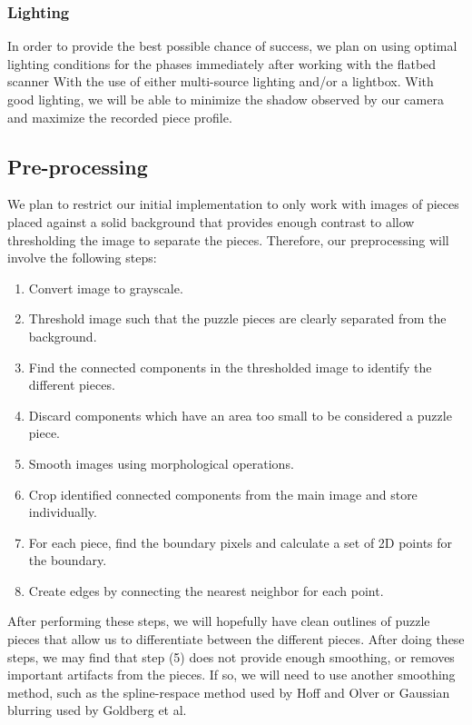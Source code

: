 \documentclass[12pt]{report}
\begin{document}
\subsubsection*{Lighting}
In order to provide the best possible chance of success, we plan on using optimal lighting conditions for the phases immediately after working with the flatbed scanner With the use of either multi-source lighting and/or a lightbox. With good lighting, we will be able to minimize the shadow observed by our camera and maximize the recorded piece profile.


\subsection*{Pre-processing}
We plan to restrict our initial implementation to only work with images of pieces placed against a solid background that provides enough contrast to allow thresholding the image to separate the pieces. Therefore, our preprocessing will involve the following steps:
\begin{enumerate}
\item Convert image to grayscale.
\item Threshold image such that the puzzle pieces are clearly separated from the background.
\item Find the connected components in the thresholded image to identify the different pieces.
\item Discard components which have an area too small to be considered a puzzle piece.
\item Smooth images using morphological operations.
\item Crop identified connected components from the main image and store individually.
\item For each piece, find the boundary pixels and calculate a set of 2D points for the boundary.
\item Create edges by connecting the nearest neighbor for each point.
\end{enumerate}
After performing these steps, we will hopefully have clean outlines of puzzle pieces that allow us to differentiate between the different pieces. After doing these steps, we may find that step (5) does not provide enough smoothing, or removes important artifacts from the pieces. If so, we will need to use another smoothing method, such as the spline-respace method used by Hoff and Olver or Gaussian blurring used by Goldberg et al.
\end{document}

